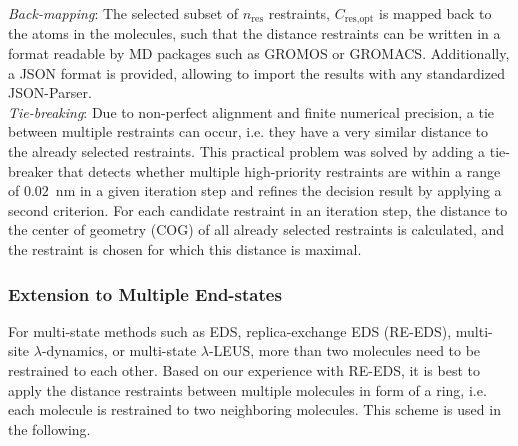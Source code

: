 \noindent \textit{Back-mapping}:
The selected subset of $n_\text{res}$ restraints, $C_\text{res,opt}$ is mapped back to the atoms in the molecules, such that the distance restraints can be written in a format readable by MD packages such as GROMOS\cite{Schmid2012} or GROMACS.\cite{Abraham2015} Additionally, a JSON\cite{Pezoa2016} format is provided, allowing to import the results with any standardized JSON-Parser. \\

\noindent \textit{Tie-breaking}:
Due to non-perfect alignment and finite numerical precision, a tie between multiple restraints can occur, i.e. they have a very similar distance to the already selected restraints. This practical problem was solved by adding a tie-breaker that detects whether multiple high-priority restraints are within a range of $0.02$~nm in a given iteration step and refines the decision result by applying a second criterion. 
For each candidate restraint in an iteration step, the distance to the center of geometry (COG) of all already selected restraints is calculated, and the restraint is chosen for which this distance is maximal.


\subsubsection{Extension to Multiple End-states}

For multi-state methods such as EDS\cite{Christ2007,Christ2008}, replica-exchange EDS (RE-EDS)\cite{Sidler2016,Sidler2017,Ries2022}, multi-site $\lambda$-dynamics,\cite{Knight2011} or multi-state $\lambda$-LEUS,\cite{Bieler2015} more than two molecules need to be restrained to each other. Based on our experience with RE-EDS, it is best to apply the distance restraints between multiple molecules in form of a ring, i.e. each molecule is restrained to two neighboring molecules.\cite{Ries2022} This scheme is used in the following.


